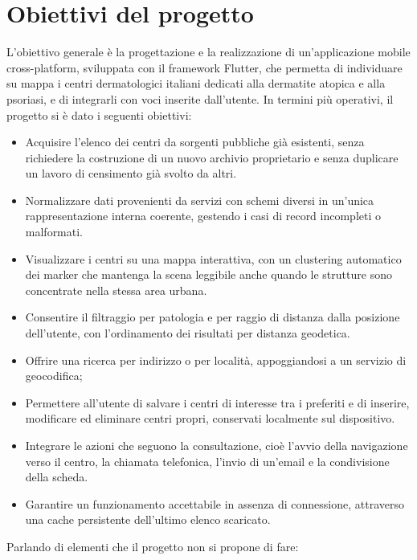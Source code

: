 \section{Obiettivi del progetto}\label{sec:obiettivi-progetto}

L'obiettivo generale è la progettazione e la realizzazione di un'applicazione mobile cross-platform, sviluppata con il
framework Flutter, che permetta di individuare su mappa i centri dermatologici italiani dedicati alla dermatite atopica
e alla psoriasi, e di integrarli con voci inserite dall'utente.
In termini più operativi, il progetto si è dato i seguenti obiettivi:

\begin{itemize}[itemsep=2pt]
  \item Acquisire l'elenco dei centri da sorgenti pubbliche già esistenti, senza richiedere la costruzione di un nuovo archivio
  proprietario e senza duplicare un lavoro di censimento già svolto da altri.
  \item Normalizzare dati provenienti da servizi con schemi diversi in un'unica rappresentazione interna coerente, gestendo
  i casi di record incompleti o malformati.
  \item Visualizzare i centri su una mappa interattiva, con un clustering automatico dei marker che mantenga la scena
  leggibile anche quando le strutture sono concentrate nella stessa area urbana.
  \item Consentire il filtraggio per patologia e per raggio di distanza dalla posizione dell'utente, con l'ordinamento dei
  risultati per distanza geodetica.
  \item Offrire una ricerca per indirizzo o per località, appoggiandosi a un servizio di geocodifica;
  \item Permettere all'utente di salvare i centri di interesse tra i preferiti e di inserire, modificare ed eliminare centri propri,
  conservati localmente sul dispositivo.
  \item Integrare le azioni che seguono la consultazione, cioè l'avvio della navigazione verso il centro, la chiamata telefonica,
  l'invio di un'email e la condivisione della scheda.
  \item Garantire un funzionamento accettabile in assenza di connessione, attraverso una cache persistente dell'ultimo elenco scaricato.
\end{itemize}

Parlando di elementi che il progetto non si propone di fare: %

